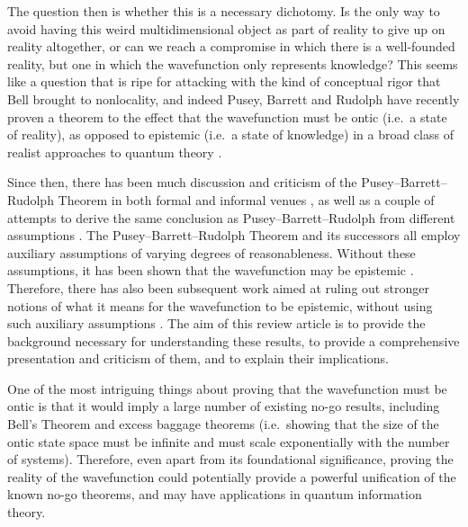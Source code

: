 \documentclass[DIV=calc,paper=a4,fontsize=11pt,twocolumn]{scrartcl} %
\theoremstyle{definition}
\theoremstyle{plain}
\begin{document}
The question then is whether this is a necessary dichotomy.  Is the
only way to avoid having this weird multidimensional object as part of
reality to give up on reality altogether, or can we reach a compromise
in which there is a well-founded reality, but one in which the
wavefunction only represents knowledge?  This seems like a question
that is ripe for attacking with the kind of conceptual rigor that Bell
brought to nonlocality, and indeed Pusey, Barrett and Rudolph have
recently proven a theorem to the effect that the wavefunction must be
ontic (i.e.\ a state of reality), as opposed to epistemic (i.e.\ a
state of knowledge) in a broad class of realist approaches to quantum
theory \cite{Pusey2012}.

Since then, there has been much discussion and criticism of the
Pusey--Barrett--Rudolph Theorem in both formal \cite{Bub2012,
  Bub2012a, Drezet2012, Drezet2012a, Emerson2013, Hall2011,
  Hofmann2011, Mansfield2013, Miller2013, Schlosshauer2013,
  Schlosshauer2012, Wallden2013} and informal venues
\cite{Aaronson2011, Griffiths2012, Leifer2011, Leifer2012a,
  Leifer2011a, Motl2011, Reich2012, Reich2011, Spekkens2012,
  Wallace2011}, as well as a couple of attempts to derive the same
conclusion as Pusey--Barrett--Rudolph from different assumptions
\cite{Colbeck2012, Hardy2013}.  The Pusey--Barrett--Rudolph Theorem
and its successors all employ auxiliary assumptions of varying degrees
of reasonableness.  Without these assumptions, it has been shown that
the wavefunction may be epistemic \cite{Lewis2012}.  Therefore, there
has also been subsequent work aimed at ruling out stronger notions of
what it means for the wavefunction to be epistemic, without using such
auxiliary assumptions \cite{Aaronson2013, Barrett2013, Branciard2014,
  Leifer2013c, Leifer2014, Maroney2012, Maroney2012a, Patra2013a}.
The aim of this review article is to provide the background necessary
for understanding these results, to provide a comprehensive
presentation and criticism of them, and to explain their implications.

One of the most intriguing things about proving that the wavefunction
must be ontic is that it would imply a large number of existing no-go
results, including Bell's Theorem \cite{Bell1964} and excess baggage
theorems \cite{Hardy2004, Montina2008, Montina2011}(i.e.\ showing that
the size of the ontic state space must be infinite and must scale
exponentially with the number of systems).  Therefore, even apart from
its foundational significance, proving the reality of the wavefunction
could potentially provide a powerful unification of the known no-go
theorems, and may have applications in quantum information theory.
\end{document}
